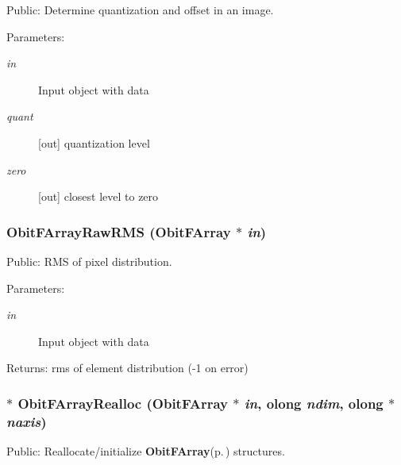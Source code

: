 Public: Determine quantization and offset in an image. 

\begin{Desc}
\item[Parameters:]
\begin{description}
\item[{\em in}]Input object with data \item[{\em quant}][out] quantization level \item[{\em zero}][out] closest level to zero \end{description}
\end{Desc}
\subsubsection{ Obit\-FArray\-Raw\-RMS ({\bf Obit\-FArray} $\ast$ {\em in})}\label{ObitFArray_8h_a70}


Public: RMS of pixel distribution. 

\begin{Desc}
\item[Parameters:]
\begin{description}
\item[{\em in}]Input object with data \end{description}
\end{Desc}
\begin{Desc}
\item[Returns:]rms of element distribution (-1 on error) \end{Desc}
\subsubsection{$\ast$ Obit\-FArray\-Realloc ({\bf Obit\-FArray} $\ast$ {\em in}, {\bf olong} {\em ndim}, {\bf olong} $\ast$ {\em naxis})}\label{ObitFArray_8h_a63}


Public: Reallocate/initialize {\bf Obit\-FArray}{\rm (p.\,\pageref{structObitFArray})} structures. 

